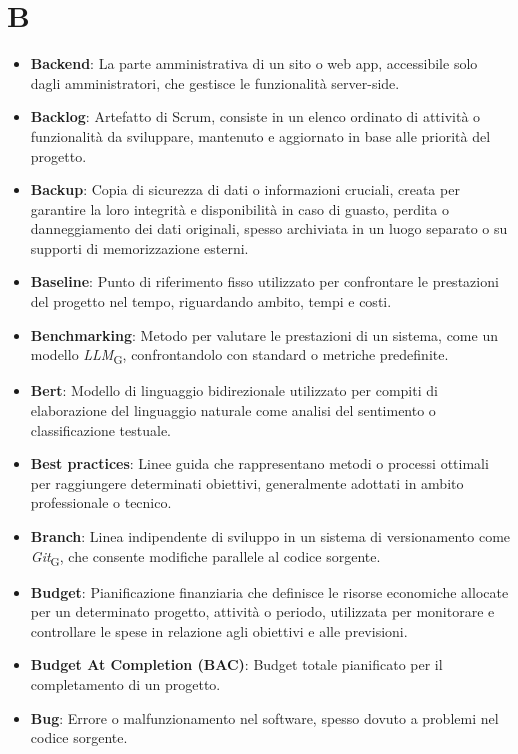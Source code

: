 \section{B}
\begin{itemize}
    \item \textbf{Backend}: La parte amministrativa di un sito o web app, accessibile solo dagli amministratori, che gestisce le funzionalità server-side.
    \item \textbf{Backlog}: Artefatto di Scrum, consiste in un elenco ordinato di attività o funzionalità da sviluppare, mantenuto e aggiornato in base alle priorità del progetto.
    \item \textbf{Backup}: Copia di sicurezza di dati o informazioni cruciali, creata per garantire la loro integrità e disponibilità in caso di guasto, perdita o danneggiamento dei dati originali, spesso archiviata in un luogo separato o su supporti di memorizzazione esterni.
    \item \textbf{Baseline}: Punto di riferimento fisso utilizzato per confrontare le prestazioni del progetto nel tempo, riguardando ambito, tempi e costi.
    \item \textbf{Benchmarking}: Metodo per valutare le prestazioni di un sistema, come un modello \textit{LLM}\textsubscript{G}, confrontandolo con standard o metriche predefinite.
    \item \textbf{Bert}: Modello di linguaggio bidirezionale utilizzato per compiti di elaborazione del linguaggio naturale come analisi del sentimento o classificazione testuale.
    \item \textbf{Best practices}: Linee guida che rappresentano metodi o processi ottimali per raggiungere determinati obiettivi, generalmente adottati in ambito professionale o tecnico.
    \item \textbf{Branch}: Linea indipendente di sviluppo in un sistema di versionamento come \textit{Git}\textsubscript{G}, che consente modifiche parallele al codice sorgente.
    \item \textbf{Budget}: Pianificazione finanziaria che definisce le risorse economiche allocate per un determinato progetto, attività o periodo, utilizzata per monitorare e controllare le spese in relazione agli obiettivi e alle previsioni.
    \item \textbf{Budget At Completion (BAC)}: Budget totale pianificato per il completamento di un progetto.
    \item \textbf{Bug}: Errore o malfunzionamento nel software, spesso dovuto a problemi nel codice sorgente.
\end{itemize}
